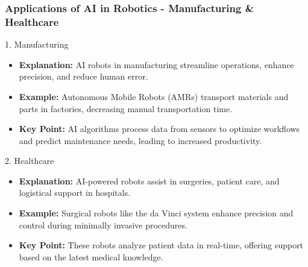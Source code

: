 \documentclass[aspectratio=169]{beamer}
\begin{document}
\begin{frame}[fragile]
    \frametitle{Applications of AI in Robotics - Manufacturing & Healthcare}
    \begin{block}{1. Manufacturing}
        \begin{itemize}
            \item \textbf{Explanation:} AI robots in manufacturing streamline operations, enhance precision, and reduce human error.
            \item \textbf{Example:} Autonomous Mobile Robots (AMRs) transport materials and parts in factories, decreasing manual transportation time.
            \item \textbf{Key Point:} AI algorithms process data from sensors to optimize workflows and predict maintenance needs, leading to increased productivity.
        \end{itemize}
    \end{block}

    \begin{block}{2. Healthcare}
        \begin{itemize}
            \item \textbf{Explanation:} AI-powered robots assist in surgeries, patient care, and logistical support in hospitals.
            \item \textbf{Example:} Surgical robots like the da Vinci system enhance precision and control during minimally invasive procedures.
            \item \textbf{Key Point:} These robots analyze patient data in real-time, offering support based on the latest medical knowledge.
        \end{itemize}
    \end{block}
\end{frame}
\end{document}
